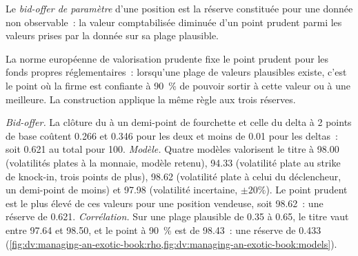 \begin{definition}\label{def:dv:managing-an-exotic-book:param}
Le \emph{bid-offer de paramètre} d'une position est la réserve constituée pour une donnée non observable~: la valeur comptabilisée diminuée d'un point prudent parmi
les valeurs prises par la donnée sur sa plage plausible.
\end{definition}

La norme européenne de valorisation prudente fixe le point prudent pour les fonds propres réglementaires~: lorsqu'une plage de valeurs plausibles existe, c'est le point où la firme est
confiante à 90~\% de pouvoir sortir à cette valeur ou à une meilleure. La construction applique la même règle aux trois réserves.

\begin{example}\label{ex:dv:managing-an-exotic-book:reserves}
\emph{Bid-offer.} La clôture du  à un demi-point de fourchette et celle du delta à 2 points de base coûtent 0.266 et 0.346 pour les deux  et moins de 0.01 pour les deltas~: soit 0.621 au total
pour 100. \emph{Modèle.} Quatre modèles valorisent le titre à 98.00 (volatilités plates à la monnaie, modèle retenu), 94.33 (volatilité plate au strike de knock-in, trois points
de plus), 98.62 (volatilité plate à celui du déclencheur, un demi-point de moins) et 97.98 (volatilité incertaine, $\pm20\%$). Le point prudent est le plus élevé de ces valeurs pour une
position vendeuse, soit 98.62~: une réserve de 0.621. \emph{Corrélation.} Sur une plage plausible de 0.35 à 0.65, le titre vaut entre 97.64 et 98.50, et le point à 90~\% est de 98.43~: une
réserve de 0.433 (\cref{fig:dv:managing-an-exotic-book:rho,fig:dv:managing-an-exotic-book:models}).
\end{example}

